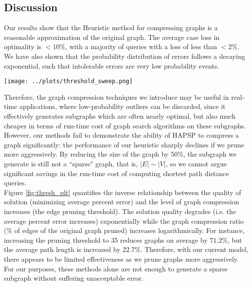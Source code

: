 \documentclass[10.5pt,journal]{IEEEtran}
\begin{document}
	\subsection{Discussion}
		Our results show that the Heuristic method for compressing graphs is a reasonable approximation
		of the original graph. The average case loss in optimality is $<10\%$, with a majority of
		queries with a loss of less than $<2\%$. We have also shown that the probability distribution
		of errors follows a decaying exponential, such that intolerable errors are very low probability
		events.\\
		
		\begin{figure*}[] \centering
		\texttt{[image: ../plots/threshold\_sweep.png]} 
		\caption{Solution Quality degrades as the Graph Compression Increases}
		\label{fig:thresh_plt}
		\end{figure*}
		
		
		Therefore, the graph compression techniques we introduce may be useful in real-time
		applications, where low-probability outliers can be discarded, since it effectively
		generates subgraphs which are often nearly optimal, but also much cheaper in terms
		of run-time cost of graph search algorithms on these subgraphs. \\
		
		However, our methods fail to demonstrate the ability of HAPSP to compress a graph 
		significantly: the performance of our heuristic sharply declines if we prune more aggressively.
		By reducing the size of the graph by 50$\%$, the subgraph we generate is still not a ``sparse"
		graph, that is, $|E| \sim |V|$, so we cannot argue significant savings in the run-time cost of
		computing shortest path distance queries. \\
		
		Figure \ref{fig:thresh_plt} quantifies the inverse relationship between the quality of solution
		(minimizing average percent error) and the level of graph compression increases (the edge
		pruning threshold). The solution quality degrades (i.e. the average percent error increases)
		exponentially while the graph compression ratio (\% of edges of the original graph pruned)
		increases logarithmically. For instance, increasing the pruning threshold to 35 reduces
		graphs on average by $71.2\%$, but the average path length is increased by $22.7\%$.
		Therefore, with our current model, there appears to be limited effectiveness as we 
		prune graphs more aggressively. For our purposes, these methods alone are not enough to
		generate a sparse subgraph without suffering unacceptable error.\\
		
\end{document}
